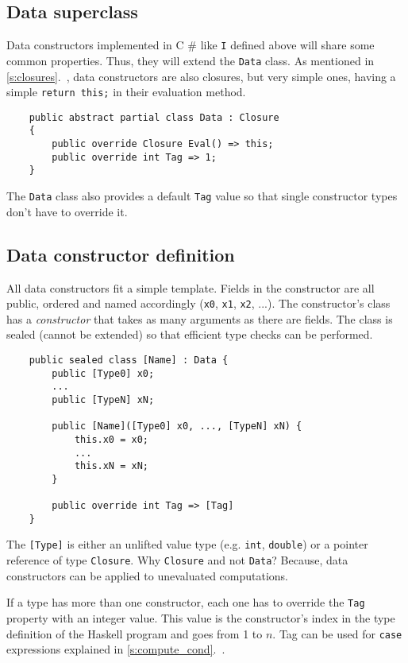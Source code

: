 \documentclass[en]{pracamgr}
\newcommand{\shrp}{%
  {\fontfamily{ppl}\selectfont\#%
  }}
\newcommand{\myref}[1]{\ref{#1}.~\textit{\nameref{#1}}}
\begin{document}
\subsection{Data superclass}

Data constructors implemented in C\shrp{} like \texttt{I} defined above
will share some common properties. Thus, they will extend the \texttt{Data} class.
As mentioned in \myref{s:closures}, data constructors are
also closures, but very simple ones, having a simple
\texttt{return this;} in their evaluation method.

\begin{verbatim}
    public abstract partial class Data : Closure
    {
        public override Closure Eval() => this;
        public override int Tag => 1;
    }
\end{verbatim}

The \texttt{Data} class also provides a default \texttt{Tag}
value so that single constructor types don't have to override it.

\subsection{Data constructor definition}

All data constructors fit a simple template.
Fields in the constructor are all public, ordered and named accordingly
(\texttt{x0}, \texttt{x1}, \texttt{x2}, ...).
The constructor's class has a \textit{constructor} that takes
as many arguments as there are fields.
The class is sealed (cannot be extended) so that efficient
type checks can be performed.

\begin{verbatim}
    public sealed class [Name] : Data {
        public [Type0] x0;
        ...
        public [TypeN] xN;

        public [Name]([Type0] x0, ..., [TypeN] xN) {
            this.x0 = x0;
            ...
            this.xN = xN;
        }

        public override int Tag => [Tag]
    }
\end{verbatim}

The \verb|[Type]| is either an unlifted value type
(e.g. \texttt{int}, \texttt{double}) or a pointer reference
of type \texttt{Closure}. Why \texttt{Closure} and not \texttt{Data}?
Because, data constructors can be applied to unevaluated computations.

If a type has more than one constructor, each one has to
override the \texttt{Tag} property with an integer value.
This value is the constructor's index in the type definition of
the Haskell program and goes from 1 to $n$.
Tag can be used for \texttt{case} expressions explained in \myref{s:compute_cond}.
\end{document}
